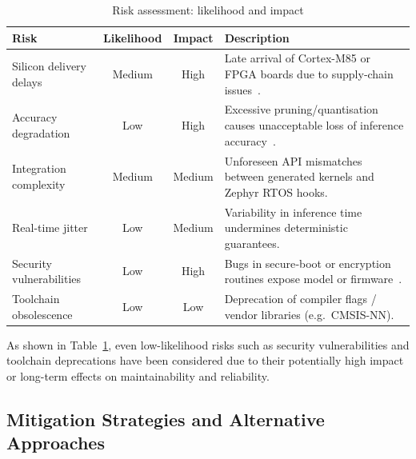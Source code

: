 \begin{table}[h]
  \centering
  \begin{tabular}{p{4cm} c c p{6cm}}
    \hline
    \textbf{Risk} & \textbf{Likelihood} & \textbf{Impact} & \textbf{Description} \\
    \hline
    Silicon delivery delays & Medium & High &
      Late arrival of Cortex-M85 or FPGA boards due to supply‐chain issues~\cite{deloitte2021supplychain}. \\
    Accuracy degradation & Low & High &
      Excessive pruning/quantisation causes unacceptable loss of inference accuracy~\cite{krishnamoorthi2018quantizing}. \\
    Integration complexity & Medium & Medium &
      Unforeseen API mismatches between generated kernels and Zephyr RTOS hooks. \\
    Real-time jitter & Low & Medium &
      Variability in inference time undermines deterministic guarantees. \\
    Security vulnerabilities & Low & High &
      Bugs in secure‐boot or encryption routines expose model or firmware~\cite{nist2022supplychain}. \\
    Toolchain obsolescence & Low & Low &
      Deprecation of compiler flags / vendor libraries (e.g.\ CMSIS-NN). \\
    \hline
  \end{tabular}
  \caption{Risk assessment: likelihood and impact}
  \label{tab:risk_assessment}
\end{table}

As shown in Table~\ref{tab:risk_assessment}, even low-likelihood risks such as security vulnerabilities and toolchain deprecations have been considered due to their potentially high impact or long-term effects on maintainability and reliability.

\subsection{Mitigation Strategies and Alternative Approaches}

